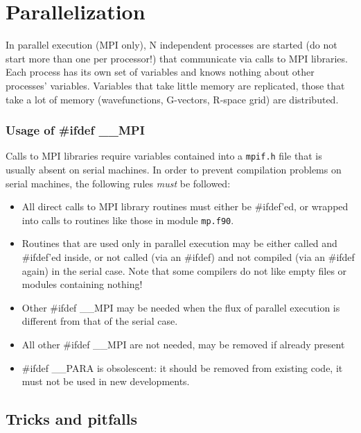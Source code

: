 \documentclass[12pt,a4paper]{article}
\begin{document}
\section{Parallelization}

In parallel execution (MPI only), N independent processes are started
(do not start more than one per processor!) that communicate via calls
to MPI libraries. Each process has its own set of variables and knows
nothing about other processes' variables. Variables that take little memory 
are replicated, those that take a lot of memory (wavefunctions, G-vectors, 
R-space grid) are distributed.
    
\subsubsection{Usage of \#ifdef \_\_MPI}

Calls to MPI libraries require variables contained into a 
\texttt{mpif.h} file that is usually absent on serial machines.
In order to prevent compilation problems on serial machines,
the following rules {\em must} be followed:
\begin{itemize}
\item All direct calls to MPI library routines must either be 
\#ifdef'ed, or wrapped into calls to routines like those in
module \texttt{mp.f90}.
\item Routines that are used only in parallel execution may be either
called and \#ifdef'ed inside, or not called (via an \#ifdef) and not 
compiled (via an \#ifdef again) in the serial case. Note that
some compilers do not like empty files or modules containing nothing!
\item Other \#ifdef \_\_MPI may be needed when the flux of parallel
execution is different from that of the serial case.
\item All other \#ifdef \_\_MPI are not needed, may be removed if
already present
\item \#ifdef \_\_PARA is obsolescent: it should be removed from
existing code, it must not be used in new developments.
\end{itemize}

\subsection{Tricks and pitfalls}
\end{document}
